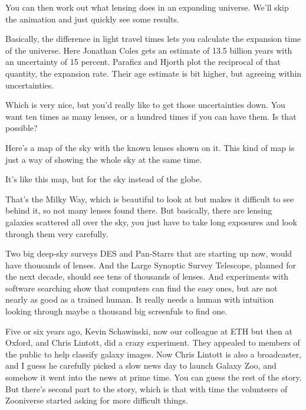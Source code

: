 You can then work out what lensing does in an expanding universe.
We'll skip the animation and just quickly see some results.

\next

Basically, the difference in light travel times lets you calculate the
expansion time of the universe.  Here Jonathan Coles gets an estimate
of 13.5 billion years with an uncertainty of 15 percent.  Paraficz and
Hjorth plot the reciprocal of that quantity, the expansion rate.
Their age estimate is bit higher, but agreeing within uncertainties.

Which is very nice, but you'd really like to get those uncertainties
down.  You want ten times as many lenses, or a hundred times if you
can have them.  Is that possible?

\next

Here's a map of the sky with the known lenses shown on it.  This kind
of map is just a way of showing the whole sky at the same time.

\next

It's like this map, but for the sky instead of the globe.

\next

That's the Milky Way, which is beautiful to look at but makes it
difficult to see behind it, so not many lenses found there.  But
basically, there are lensing galaxies scattered all over the sky, you
just have to take long exposures and look through them very carefully.

Two big deep-sky surveys DES and Pan-Starrs that are starting up now,
would have thousands of lenses.  And the Large Synoptic Survey
Telescope, planned for the next decade, should see tens of thousands
of lenses.  And experiments with software searching show that
computers can find the easy ones, but are not nearly as good as a
trained human.  It really needs a human with intuition looking through
maybe a thousand big screenfuls to find one.

Five or six years ago, Kevin Schawinski, now our colleague at ETH but
then at Oxford, and Chris Lintott, did a crazy experiment.  They
appealed to members of the public to help classify galaxy images.  Now
Chris Lintott is also a broadcaster, and I guess he carefully picked a
slow news day to launch Galaxy Zoo, and somehow it went into the news
at prime time.  You can guess the rest of the story.  But there's
second part to the story, which is that with time the volunteers of
Zooniverse started asking for more difficult things.

